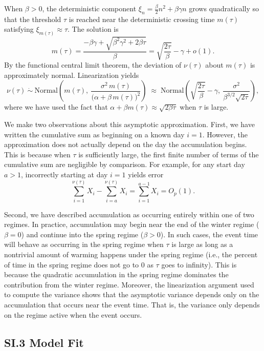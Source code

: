 \documentclass[12pt,letterpaper]{article}
\begin{document}
When \(\beta>0\), the deterministic component
\(\xi_n=\frac{\beta}{2}n^2+\beta\gamma n\) grows quadratically so that
the threshold \(\tau\) is reached near the deterministic crossing time
\(m(\tau)\) satisfying \(\xi_{m(\tau)}\approx \tau\). The solution is \[
m(\tau)=\frac{-\beta\gamma+\sqrt{\beta^2\gamma^2+2\beta \tau}}{\beta}
=
\sqrt{\frac{2\tau}{\beta}}-\gamma+o(1).
\] By the functional central limit theorem, the deviation of \(\nu(\tau)\)
about \(m(\tau)\) is approximately normal. Linearization yields \[
\nu(\tau)\ \dot{\sim}\ \mathrm{Normal}\!\left(m(\tau),\ \frac{\sigma^2\,m(\tau)}{\bigl(\alpha+\beta\,m(\tau)\bigr)^2}\right)
\;\approx\;
\mathrm{Normal}\!\left(\sqrt{\frac{2\tau}{\beta}}-\gamma,\ \frac{\sigma^2}{\beta^{3/2}\sqrt{2\tau}}\right),
\] where we have used the fact that
\(\alpha+\beta m(\tau) \approx \sqrt{2\beta \tau}\) when
\(\tau\) is large. 

We make two observations about this asymptotic approximation. First, we have written the cumulative sum as beginning on a known day \(i = 1\). 
However, the approximation does not actually depend on the day the accumulation begins. This is because when \(\tau\) is sufficiently large, the first finite number of terms of the cumulative sum are negligible by comparison. For example, for any start day \(a > 1\), incorrectly starting at day \(i = 1\) yields error \[\sum_{i=1}^{\nu(\tau)}X_i-\sum_{i=a}^{\nu(\tau)}X_i = \sum_{i=1}^{a-1}X_i = O_p(1).\]

Second, we have described accumulation as occurring entirely within one of two regimes. In practice, accumulation may begin near the end of the winter regime (\(\beta = 0 \)) 
and continue into the spring regime (\(\beta > 0\)). In such cases, the event time will behave as occurring in the spring regime when \(\tau\) is large as long as a nontrivial 
amount of warming happens under  the spring regime (i.e., the percent of time in the spring regime does not go to 0 as \(\tau\) goes to infinity). This is because the 
quadratic accumulation in the spring regime dominates the contribution from the winter regime.  Moreover, the linearization argument used to compute the 
variance shows that the asymptotic variance depends only on the accumulation that occurs near the event time. That is, the variance only depends on 
the regime active when the event occurs.


\subsection*{SI.3 Model Fit}\label{si-model-details}
\end{document}

